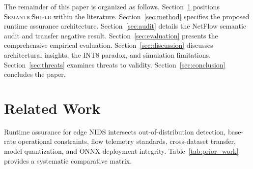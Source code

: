 \documentclass[journal]{IEEEtran}
\newcommand{\sysname}{\textsc{SemanticShield}}
\begin{document}
The remainder of this paper is organized as follows. Section~\ref{sec:related} positions \sysname{} within the literature. Section~\ref{sec:method} specifies the proposed runtime assurance architecture. Section~\ref{sec:audit} details the NetFlow semantic audit and transfer negative result. Section~\ref{sec:evaluation} presents the comprehensive empirical evaluation. Section~\ref{sec:discussion} discusses architectural insights, the INT8 paradox, and simulation limitations. Section~\ref{sec:threats} examines threats to validity. Section~\ref{sec:conclusion} concludes the paper.


\section{Related Work}
\label{sec:related}

Runtime assurance for edge NIDS intersects out-of-distribution detection, base-rate operational constraints, flow telemetry standards, cross-dataset transfer, model quantization, and ONNX deployment integrity. Table~\ref{tab:prior_work} provides a systematic comparative matrix.
\end{document}
